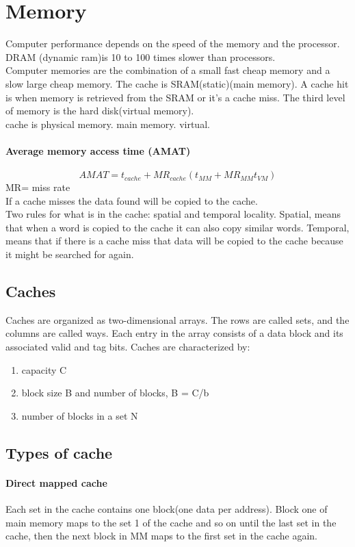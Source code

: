 \newpage
\section{Memory}
	Computer performance depends on the speed of the memory and the processor. DRAM (dynamic ram)is 10 to 100 times slower than processors.\\
	Computer memories are the combination of a small fast cheap memory and a slow large cheap memory. The cache is SRAM(static)(main memory). A cache hit is when memory is retrieved from the SRAM or it's a cache miss. The third level of memory is the hard disk(virtual memory).\\
	cache is physical memory. main memory. virtual.
	\paragraph{Average memory access time (AMAT)}
	\begin{equation}
		AMAT = t_{cache}+ MR_{cache}(t_{MM} + MR_{MM}t_{VM})
	\end{equation}
	MR= miss rate\\
	If a cache misses the data found will be copied to the cache.\\
	Two rules for what is in the cache: spatial and temporal locality. Spatial, means that when a word is copied to the cache it can also copy similar words. Temporal, means that if there is a cache miss that data will be copied to the cache because it might be searched for again.
	\subsection{Caches}
		Caches are organized as two-dimensional arrays. The rows are called sets, and the columns are called ways. Each entry in the array consists of a data block and its associated valid and tag bits. Caches are characterized by:
		\begin{enumerate}
			\item capacity C
			\item block size B and number of blocks, B = C/b
			\item number of blocks in a set N
		\end{enumerate}
	\subsection{Types of cache}
	\paragraph{Direct mapped cache}
		Each set in the cache contains one block(one data per address). Block one of main memory maps to the set 1 of the cache and so on until the last set in the cache, then the next block in MM maps to the first set in the cache again.
